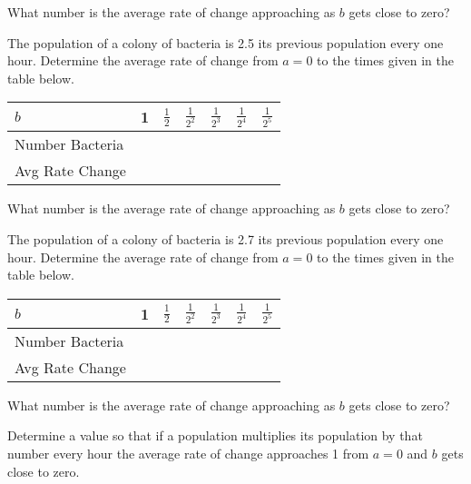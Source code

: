 \begin{problem}
\begin{subproblem}
    What number is the average rate of change approaching as $b$ gets
    close to zero?

  \item The population of a colony of bacteria is 2.5 its previous
    population every one hour. Determine the average rate of change
    from $a=0$ to
    the times   given in the table below. \\
    \begin{tabular}{p{4em}|p{3em}|p{3em}|p{3em}|p{3em}|p{3em}|p{3em}}
      $b$ & 1 & $\frac{1}{2}$ & $\frac{1}{2^2}$ & $\frac{1}{2^3}$ &
      $\frac{1}{2^4}$ & $\frac{1}{2^5}$ \\ \hline
      Number Bacteria &&&&&  \\ [12pt] \hline
      Avg Rate Change &&&&&
    \end{tabular}

    What number is the average rate of change approaching as $b$ gets
    close to zero?

  \item The population of a colony of bacteria is 2.7 its previous
    population every one hour. Determine the average rate of change
    from $a=0$ to
    the times   given in the table below. \\
    \begin{tabular}{p{4em}|p{3em}|p{3em}|p{3em}|p{3em}|p{3em}|p{3em}}
      $b$ & 1 & $\frac{1}{2}$ & $\frac{1}{2^2}$ & $\frac{1}{2^3}$ &
      $\frac{1}{2^4}$ & $\frac{1}{2^5}$ \\ \hline
      Number Bacteria &&&&&  \\ [12pt] \hline
      Avg Rate Change &&&&&
    \end{tabular}

    What number is the average rate of change approaching as $b$ gets
    close to zero?

  \item Determine a value so that if a population multiplies its
    population by that number every hour the average rate of change
    approaches 1 from $a=0$ and $b$ gets close to zero.

  \end{subproblem}

\end{problem}



